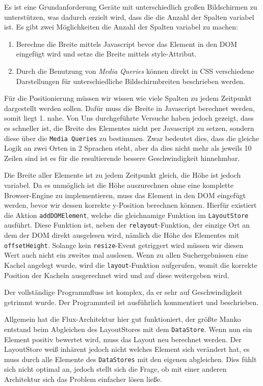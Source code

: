 \documentclass[12pt,twoside]{book}
\begin{document}
Es ist eine Grundanforderung Geräte mit unterschiedlich großen Bildschirmen zu unterstützen, was dadurch erzielt wird, dass die die Anzahl der Spalten variabel ist.
Es gibt zwei Möglichkeiten die Anzahl der Spalten variabel zu machen:

\begin{enumerate}
  \item Berechne die Breite mittels Javascript bevor das Element in den DOM eingefügt wird und setze die Breite mittels style-Attribut.
  \item Durch die Benutzung von \textit{Media Queries} können direkt in CSS verschiedene Darstellungen für unterschiedliche Bildschirmbreiten beschrieben werden.
\end{enumerate}

Für die Positionierung müssen wir wissen wie viele Spalten zu jedem Zeitpunkt dargestellt werden sollen. Dafür muss die Breite in Javascript berechnet werden, somit liegt 1. nahe. Von Uns durchgeführte Versuche haben jedoch gezeigt, dass es schneller ist, die Breite des Elementes nicht per Javascript zu setzen, sondern diese über die \texttt{Media Queries} zu bestimmen. Zwar bedeutet dies, dass die gleiche Logik an zwei Orten in 2 Sprachen steht, aber da dies nicht mehr als jeweils 10 Zeilen sind ist es für die resultierende bessere Geschwindigkeit hinnehmbar.

Die Breite aller Elemente ist zu jedem Zeitpunkt gleich, die Höhe ist jedoch variabel. Da es unmöglich ist die Höhe auszurechnen ohne eine komplette Browser-Engine zu implementieren, muss das Element in den DOM eingefügt werden, bevor wir dessen korrekte y-Position berechnen können. Hierfür existiert die Aktion \texttt{addDOMElement}, welche die gleichnamige Funktion im \texttt{LayoutStore} ausführt. Diese Funktion ist, neben der \texttt{relayout}-Funktion, der einzige Ort an dem der DOM direkt ausgelesen wird, nämlich die Höhe des Elementes mit \texttt{offsetHeight}. Solange kein \texttt{resize}-Event getriggert wird müssen wir diesen Wert auch nicht ein zweites mal auslesen.
Wenn zu allen Suchergebnissen eine Kachel angelegt wurde, wird die \texttt{layout}-Funktion aufgerufen, womit die korrekte Position der Kacheln ausgerechnet wird und auf diese weitergeben wird.

Der vollständige Programmfluss ist komplex, da er sehr auf Geschwindigkeit getrimmt wurde. Der Programmteil ist ausführlich kommentiert und beschrieben.

Allgemein hat die Flux-Architektur hier gut funktioniert, der größte Manko entstand beim Abgleichen des LayoutStores mit dem \texttt{DataStore}. Wenn nun ein Element positiv bewertet wird, muss das Layout neu berechnet werden. Der LayoutStore weiß inhärent jedoch nicht welches Element sich verändert hat, es muss durch alle Elemente des \texttt{DataStores} mit den eigenen abgleichen. Dies fühlt sich nicht optimal an, jedoch stellt sich die Frage, ob mit einer anderen Architektur sich das Problem einfacher lösen ließe.
\end{document}
